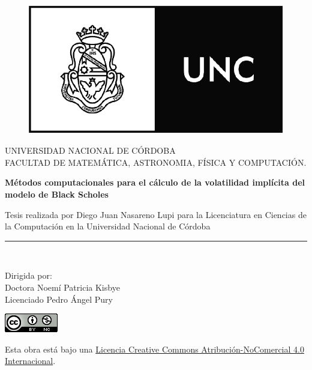 \documentclass[a4paper,openright, 12pt, oneside]{book}
\begin{document}
\begin{titlepage}
\begin{center}


\begin{figure}
  \begin{center}
    \leavevmode

    \includegraphics[width=0.6\linewidth]{UNCLOGO.png}
  \end{center}
\end{figure}

\vspace*{0.4in}
UNIVERSIDAD NACIONAL DE C\'ORDOBA\\
\vspace*{0.15in}
FACULTAD DE MATEM\'ATICA, ASTRONOMIA, F\'ISICA Y COMPUTACI\'ON.\\
\vspace*{0.15in}
\begin{large}
\end{large}
\vspace*{0.2in}
\begin{Large}
\textbf{M\'etodos computacionales para el c\'alculo de la volatilidad impl\'icita del modelo de Black Scholes} \\
\end{Large}
\vspace*{0.3in}
\begin{large}
Tesis realizada por Diego Juan Nasareno Lupi para la Licenciatura en Ciencias de la Computaci\'on en la Universidad Nacional de C\'ordoba\end{large}

\vspace*{0.1in}
\rule{80mm}{0.1mm}\\
\vspace*{0.1in}
\begin{large}
Dirigida por: \\
Doctora Noem\'i Patricia Kisbye \\
Licenciado Pedro \'Angel Pury\\
\vspace*{0.2in}
\end{large}
\end{center}

\begin{center}
    \includegraphics{ccmon}
\end{center}
Esta obra está bajo una \textcolor{blue}{\href{http://creativecommons.org/licenses/by-nc/4.0/}{Licencia Creative Commons Atribución-NoComercial 4.0 Internacional}}.

\end{titlepage}
\end{document}
